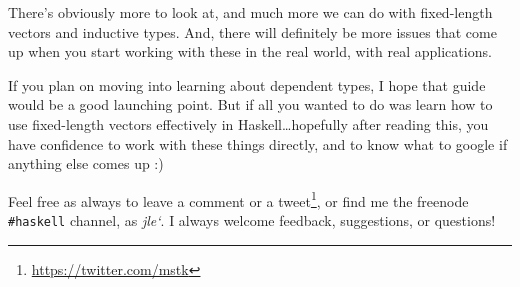 \documentclass[]{article}
\renewcommand{\href}[2]{#2\footnote{\url{#1}}}
\begin{document}
There's obviously more to look at, and much more we can do with fixed-length
vectors and inductive types. And, there will definitely be more issues that come
up when you start working with these in the real world, with real applications.

If you plan on moving into learning about dependent types, I hope that guide
would be a good launching point. But if all you wanted to do was learn how to
use fixed-length vectors effectively in Haskell\ldots{}hopefully after reading
this, you have confidence to work with these things directly, and to know what
to google if anything else comes up :)

Feel free as always to leave a comment or a
\href{https://twitter.com/mstk}{tweet}, or find me the freenode
\texttt{\#haskell} channel, as \emph{jle`}. I always welcome feedback,
suggestions, or questions!
\end{document}
